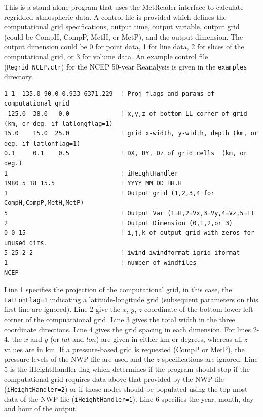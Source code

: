 \documentclass[11pt]{article}   %
\begin{document}
This is a stand-alone program that uses the MetReader interface to calculate
regridded atmospheric data.  A control file is provided which defines the
computational grid specifications, output time, output variable, output
grid (could be CompH, CompP, MetH, or MetP), and the output dimension.
The output dimension could be 0 for point data, 1 for line data,
2 for slices of the computational grid, or 3
for volume data.  An example control file (\texttt{Regrid\_NCEP.ctr}) for
the NCEP 50-year Reanalysis is given  in the \texttt{examples} directory.
\footnotesize
\begin{verbatim}
1 1 -135.0 90.0 0.933 6371.229  ! Proj flags and params of computational grid
-125.0  38.0   0.0              ! x,y,z of bottom LL corner of grid (km, or deg. if latlongflag=1)
15.0    15.0  25.0              ! grid x-width, y-width, depth (km, or deg. if latlonflag=1)
0.1     0.1    0.5              ! DX, DY, Dz of grid cells  (km, or deg.)
1                               ! iHeightHandler
1980 5 18 15.5                  ! YYYY MM DD HH.H
1                               ! Output grid (1,2,3,4 for CompH,CompP,MetH,MetP)
5                               ! Output Var (1=H,2=Vx,3=Vy,4=Vz,5=T)
2                               ! Output Dimension (0,1,2,or 3)
0 0 15                          ! i,j,k of output grid with zeros for unused dims.
5 25 2 2                        ! iwind iwindformat igrid iformat
1                               ! number of windfiles
NCEP
\end{verbatim}
\normalsize
Line 1 specifies the projection of the computational grid, in this case, the
\texttt{LatLonFlag=1} indicating
a latitude-longitude grid (subsequent parameters on this first line are ignored).
Line 2 give the $x$, $y$, $z$ coordinate of the bottom lower-left corner of the compuataional
grid.
Line 3 gives the total width in the three coordinate directions.  
Line 4 gives the grid spacing in each dimension.  For lines 2-4, the $x$ and $y$ (or $lat$ and $lon$)
are given in either $\mathrm{km}$ or degrees, whereas all $z$ values are in $\mathrm{km}$.  If a
pressure-based grid is requested (CompP or MetP), the pressure levels of the NWP file are used
and the $z$ specifications are ignored.
Line 5 is the iHeightHandler flag which determines if the program should stop if the computational
grid requires data above that provided by the NWP file (\texttt{iHeightHandler=2}) or if those nodes
should be populated using the top-most data of the NWP file (\texttt{iHeightHandler=1}).
Line 6 specifies the year, month, day and hour of the output.
\end{document}
